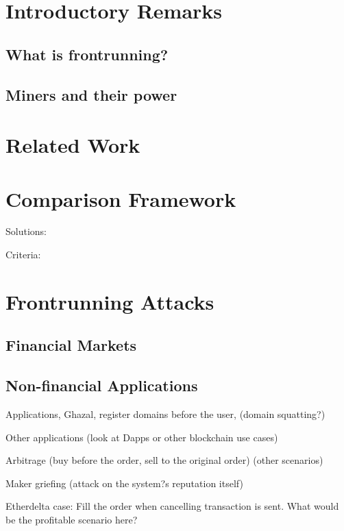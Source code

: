 \section{Introductory Remarks}

\subsection{What is frontrunning?} %
\subsection{Miners and their power} 


\section{Related Work}



\section{Comparison Framework}

Solutions: \par\noindent
Criteria:




\section{Frontrunning Attacks}

\subsection{Financial Markets}

\subsection{Non-financial Applications}
Applications, Ghazal, register domains before the user, (domain squatting?) \par\noindent
Other applications (look at Dapps or other blockchain use cases)\par\noindent
Arbitrage (buy before the order, sell to the original order) (other scenarios)\par\noindent
Maker griefing (attack on the system?s reputation itself)\par\noindent
Etherdelta case: Fill the order when cancelling transaction is sent. What would be the profitable scenario here?

